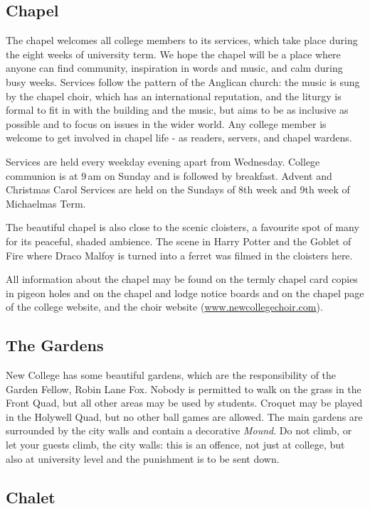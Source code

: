 \documentclass[a4paper,fleqn,12pt]{book} %
\begin{document}
\subsection{Chapel}
The chapel welcomes all college members to its services, which take place during the eight weeks of university term. We hope the chapel will be a place where anyone can find community, inspiration in words and music, and calm during busy weeks. Services follow the pattern of the Anglican church: the music is sung by the chapel choir, which has an international reputation, and the liturgy is formal to fit in with the building and the music, but aims to be as inclusive as possible and to focus on issues in the wider world. Any college member is welcome to get involved in chapel life - as readers, servers, and chapel wardens.

Services are held every weekday evening apart from Wednesday. College communion is at 9\,am on Sunday and is followed by breakfast. Advent and Christmas Carol Services are held on the Sundays of 8th week and 9th week of Michaelmas Term.

The beautiful chapel is also close to the scenic cloisters, a favourite spot of many for its peaceful, shaded ambience. The scene in Harry Potter and the Goblet of Fire where Draco Malfoy is turned into a ferret was filmed in the cloisters here. 

All information about the chapel may be found on the termly chapel card copies
in pigeon holes and on the chapel and lodge notice boards and on the chapel page
of the college website, and the choir website (\url{www.newcollegechoir.com}).

\subsection{The Gardens}
New College has some beautiful gardens, which are the responsibility of the Garden Fellow, Robin Lane Fox. Nobody is permitted to walk on the grass in the Front Quad, but all other areas may be used by students. Croquet may be played in the Holywell Quad, but no other ball games are allowed.
The main gardens are surrounded by the city walls and contain a decorative
\emph{Mound}. Do not climb, or let your guests climb, the city walls: this is an
offence, not just at college, but also at university level and the punishment is to be sent down.

\subsection{Chalet}
\end{document}
